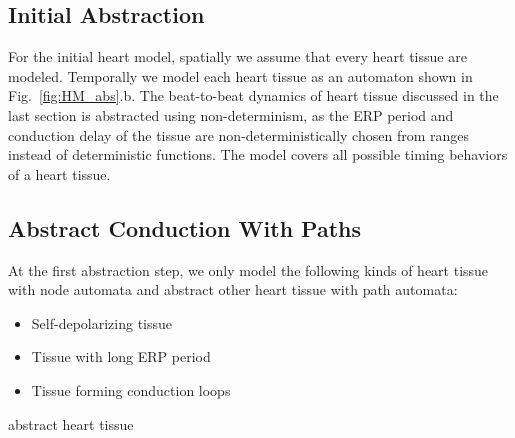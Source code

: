 \documentclass[openany]{now} %
\newcommand{\figref}[1]{Fig.~\ref{fig:#1}}
\begin{document}
\subsection{Initial Abstraction}
For the initial heart model, spatially we assume that every heart tissue are modeled. Temporally we model each heart tissue as an automaton shown in \figref{HM_abs}.b. The beat-to-beat dynamics of heart tissue discussed in the last section is abstracted using non-determinism, as the ERP period and conduction delay of the tissue are non-deterministically chosen from ranges instead of deterministic functions. The model covers all possible timing behaviors of a heart tissue. 

\subsection{Abstract Conduction With Paths}
At the first abstraction step, we only model the following kinds of heart tissue with node automata and abstract other heart tissue with path automata:
\begin{itemize}
	\item Self-depolarizing tissue
    \item Tissue with long ERP period
    \item Tissue forming conduction loops
\end{itemize}


abstract heart tissue
\end{document}
